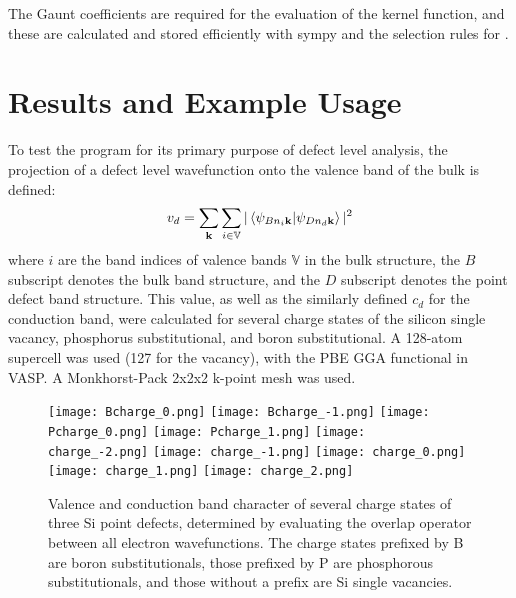 \documentclass[12pt]{article}
\begin{document}
The Gaunt coefficients are required for the evaluation of the kernel function, and these
are calculated and stored efficiently with sympy and the selection rules for \cite{gaunt_selection}.

\section{Results and Example Usage}

To test the program for its primary purpose of defect level analysis, the projection
of a defect level wavefunction onto the valence band of the bulk is defined:
\begin{equation}
v_d=\sum_{\mathbf{k}}\sum_{i\in \mathbb{V}}|\braket{\psi_{Bn_i\mathbf{k}}|\psi_{Dn_d\mathbf{k}}}|^2
\label{eq:vproj}
\end{equation}
where $i$ are the band indices of valence bands $\mathbb{V}$ in the bulk structure, the $B$
subscript denotes the bulk band structure, and the $D$ subscript denotes the point defect
band structure. This value, as well as the similarly defined $c_d$ for the conduction band,
were calculated for several charge states of the silicon single vacancy, phosphorus substitutional,
and boron substitutional. A 128-atom supercell was used (127 for the vacancy), with
the PBE GGA functional in VASP.\cite{gga,ggaerr} A Monkhorst-Pack 2x2x2 k-point mesh was used.

\begin{figure}
\texttt{[image: Bcharge\_0.png]}
\texttt{[image: Bcharge\_-1.png]}
\texttt{[image: Pcharge\_0.png]}
\texttt{[image: Pcharge\_1.png]}
\texttt{[image: charge\_-2.png]}
\texttt{[image: charge\_-1.png]}
\texttt{[image: charge\_0.png]}
\texttt{[image: charge\_1.png]}
\texttt{[image: charge\_2.png]}
\caption{Valence and conduction band character of several charge states
of three Si point defects, determined by evaluating the overlap
operator between all electron wavefunctions. The charge states prefixed by B are
boron substitutionals, those prefixed by P are phosphorous substitutionals,
and those without a prefix are Si single vacancies.}
\label{fig:ae_proj}
\end{figure}
\end{document}
